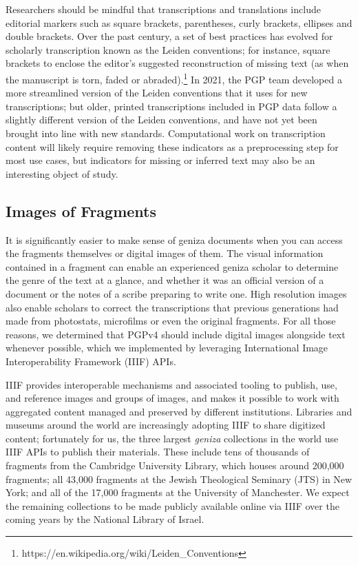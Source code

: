 \documentclass{article}
\begin{document}
Researchers should be mindful that transcriptions and translations include editorial markers such as square brackets, parentheses, curly brackets, ellipses and double brackets. Over the past century, a set of best practices has evolved for scholarly transcription known as the Leiden conventions; for instance, square brackets to enclose the editor’s suggested reconstruction of missing text (as when the manuscript is torn, faded or abraded).\footnote{https://en.wikipedia.org/wiki/Leiden\_Conventions} In 2021, the PGP team developed a more streamlined version of the Leiden conventions that it uses for new transcriptions; but older, printed transcriptions included in PGP data follow a slightly different version of the Leiden conventions, and have not yet been brought into line with new standards. Computational work on transcription content will likely require removing these indicators as a preprocessing step for most use cases, but indicators for missing or inferred text may also be an interesting object of study.

\subsection{Images of Fragments}

It is significantly easier to make sense of geniza documents when you can access the fragments themselves or digital images of them. The visual information contained in a fragment can enable an experienced geniza scholar to determine the genre of the text at a glance, and whether it was an official version of a document or the notes of a scribe preparing to write one. High resolution images also enable scholars to correct the transcriptions that previous generations had made from photostats, microfilms or even the original fragments. For all those reasons, we determined that PGPv4 should include digital images alongside text whenever possible, which we implemented by leveraging International Image Interoperability Framework (IIIF) APIs.

IIIF provides interoperable mechanisms and associated tooling to publish, use, and reference images and groups of images, and makes it possible to work with aggregated content managed and preserved by different institutions. Libraries and museums around the world are increasingly adopting IIIF to share digitized content; fortunately for us, the three largest \textit{geniza }collections in the world use IIIF APIs to publish their materials. These include tens of thousands of fragments from the Cambridge University Library, which houses around 200,000 fragments; all 43,000 fragments at the Jewish Theological Seminary (JTS) in New York; and all of the 17,000 fragments at the University of Manchester. We expect the remaining collections to be made publicly available online via IIIF over the coming years by the National Library of Israel.
\end{document}
